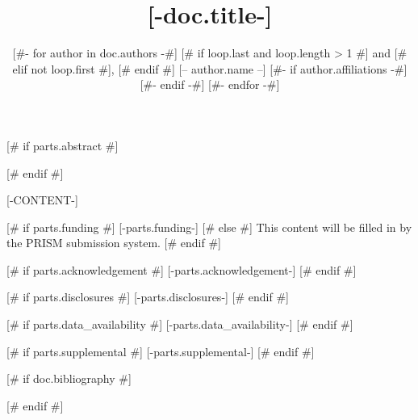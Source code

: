 \documentclass{optica-article}
[# if options.journal #]
\begin{document}
\title{[-doc.title-]}

\author{
[#- for author in doc.authors -#]
[# if loop.last and loop.length > 1 #] and 
[# elif not loop.first #], 
[# endif #]
[-- author.name --]
[#- if author.affiliations -#]

[#- endif -#]
[#- endfor -#]
}

\address{
[# for affiliation in doc.affiliations #]
\\
[# endfor #]
}



[# if parts.abstract #]
\begin{abstract*}
\end{abstract*}
[# endif #]

[-CONTENT-]

\begin{backmatter}


[# if parts.funding #]
[-parts.funding-]
[# else #]
This content will be filled in by the PRISM submission system.
[# endif #]


[# if parts.acknowledgement #]
[-parts.acknowledgement-]
[# endif #]

[# if parts.disclosures #]
[-parts.disclosures-]
[# endif #]

[# if parts.data_availability #]
[-parts.data_availability-]
[# endif #]

[# if parts.supplemental #]
[-parts.supplemental-]
[# endif #]
\end{backmatter}

[# if doc.bibliography #]

[# endif #]
\end{document}
